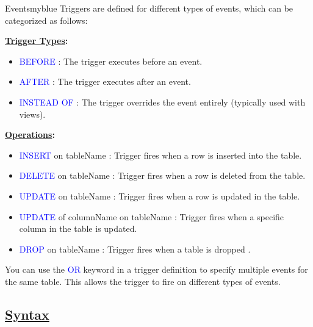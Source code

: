 \begin{prettyBox}{Events}{myblue}
Triggers are defined for different types of events, which can be categorized as follows:

\vspace{0.2cm}
\textbf{\underline{Trigger Types}:}
\begin{itemize}
    \item \textcolor{blue}{BEFORE} : The trigger executes before an event.
    \item \textcolor{blue}{AFTER} : The trigger executes after an event.
    \item \textcolor{blue}{INSTEAD OF} : The trigger overrides the event entirely (typically used with views).
\end{itemize}

\textbf{\underline{Operations}:}
\begin{itemize}
    \item \textcolor{blue}{INSERT} on tableName : Trigger fires when a row is inserted into the table.
    \item \textcolor{blue}{DELETE} on tableName : Trigger fires when a row is deleted from the table.
    \item \textcolor{blue}{UPDATE} on tableName : Trigger fires when a row is updated in the table.
    \item \textcolor{blue}{UPDATE} of columnName on tableName : Trigger fires when a specific column in the table is updated.
    \item \textcolor{blue}{DROP} on tableName : Trigger fires when a table is dropped .
\end{itemize}

You can use the \textcolor{blue}{OR} keyword in a trigger definition to specify multiple events for the same table. This allows the trigger to fire on different types of events.
\end{prettyBox}

\subsection*{\underline{Syntax}}






